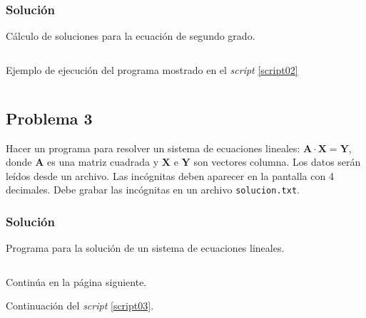 \documentclass[a4paper,12pt,final]{article}
\begin{document}
    \subsubsection*{Solución}
      \begin{listing}[H]
        \caption{Cálculo de soluciones para la ecuación de segundo grado.}
        \label{script02}
        \inputminted[firstline=5]{matlab}{./laboratorio_1/problema02.m}
      \end{listing}

      \begin{listing}[H]
        \caption{Ejemplo de ejecución del programa mostrado en el
        \emph{script} \ref{script02}}
        \label{script02sample}
        \inputminted{text}{./laboratorio_1/problema02_sample.txt}
      \end{listing}
      \vspace{\fill}

  \newpage
  \subsection*{Problema 3}
    \noindent Hacer un programa para resolver un sistema de ecuaciones
    lineales: $\mathbf{A}\cdot\mathbf{X}=\mathbf{Y}$, donde $\mathbf{A}$ es
    una matriz cuadrada y $\mathbf{X}$ e $\mathbf{Y}$ son vectores columna.
    Los datos serán leídos desde un archivo. Las incógnitas deben aparecer
    en la pantalla con 4 decimales. Debe grabar las incógnitas en un
    archivo \texttt{solucion.txt}.

    \subsubsection*{Solución}
      \begin{listing}[H]
        \caption{Programa para la solución de un sistema de ecuaciones lineales.}
        \label{script03}
        \inputminted[firstline=5,lastline=49]{matlab}{./laboratorio_1/problema03.m}
      \end{listing}
      \vspace{-1em}
      \noindent\small{Continúa en la página siguiente.}
      \vspace{\fill}

      \newpage
      \noindent\small{Continuación del \emph{script} \ref{script03}}.
      \vspace{-1em}
      \begin{listing}[H]
        \inputminted[firstline=51]{matlab}{./laboratorio_1/problema03.m}
      \end{listing}
      \vspace{\fill}
\end{document}
